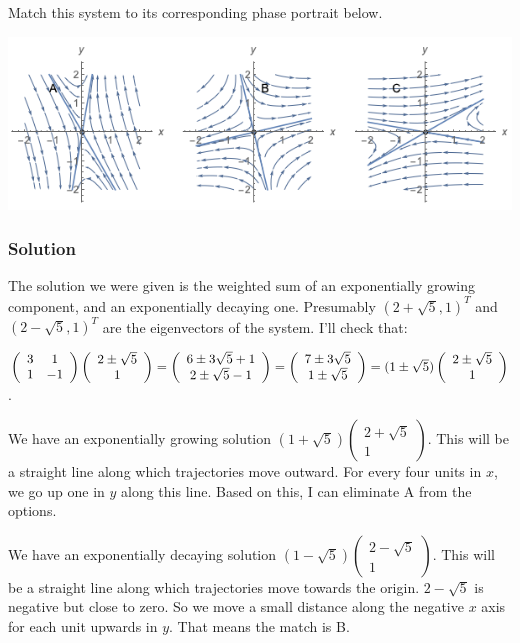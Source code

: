 \documentclass[12pt,letterpaper,noanswers]{exam}
\begin{document}
Match this system to its corresponding phase portrait below.

\includegraphics[width=\linewidth]{img/C08prac-2019-09-20.png}


\subsubsection{Solution}
The solution we were given is the weighted sum of an exponentially growing component, and an exponentially decaying one.  Presumably $(2+\sqrt{5},1)^T$ and $(2-\sqrt{5}, 1)^T$ are the eigenvectors of the system.  I'll check that:

$\left(\begin{array}{c c} 3 & 1 \\ 1  & -1 \end{array}\right)\left(\begin{array}{c} 2\pm\sqrt{5} \\ 1 \end{array}\right) = \left(\begin{array}{c} 6 \pm 3\sqrt{5} + 1 \\ 2\pm \sqrt{5} - 1\end{array}\right) = \left(\begin{array}{c} 7 \pm 3\sqrt{5} \\ 1\pm \sqrt{5} \end{array}\right) = (1\pm\sqrt{5})\left(\begin{array}{c} 2\pm\sqrt{5} \\ 1 \end{array}\right)$.

We have an exponentially growing solution $(1+\sqrt{5})\left(\begin{array}{c}2 + \sqrt{5} \\ 1\end{array}\right)$.  This will be a straight line along which trajectories move outward.  For every four units in $x$, we go up one in $y$ along this line.  Based on this, I can eliminate A from the options.

We have an exponentially decaying solution $(1-\sqrt{5})\left(\begin{array}{c}2 - \sqrt{5} \\ 1\end{array}\right)$.  This will be a straight line along which trajectories move towards the origin.  $2 - \sqrt{5}$ is negative but close to zero.  So we move a small distance along the negative $x$ axis for each unit upwards in $y$.  That means the match is B.
\end{document}
